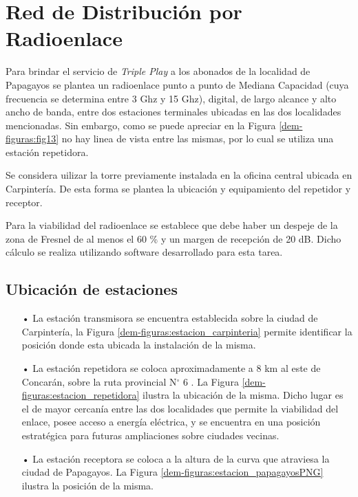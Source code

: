 \section{Red de Distribución por Radioenlace}


Para brindar el servicio de \textit{Triple Play} a los abonados de la localidad de Papagayos se plantea un radioenlace punto a punto de Mediana Capacidad (cuya frecuencia se determina entre 3 Ghz y 15 Ghz), digital, de largo alcance y alto ancho de banda, entre dos estaciones terminales ubicadas en las dos localidades mencionadas. Sin embargo, como se puede apreciar en la Figura \ref{dem-figuras:fig13} no hay linea de vista entre las mismas, por lo cual se utiliza una estación repetidora.


Se considera uilizar la torre previamente instalada en la oficina central ubicada en Carpintería. De esta forma se plantea la ubicación y equipamiento del repetidor y receptor.


Para la viabilidad del radioenlace se establece que debe haber un despeje de la zona de Fresnel de al menos el 60 \% y un margen de recepción de 20 dB. Dicho cálculo se realiza utilizando software desarrollado para esta tarea.


\subsection{Ubicación de estaciones}

\begin{enumerate}
\item[•]La estación transmisora se encuentra establecida sobre la ciudad de Carpintería, la Figura \ref{dem-figuras:estacion_carpinteria} permite identificar la posición donde esta ubicada la instalación de la misma.


\item[•]La estación repetidora se coloca aproximadamente a 8 km al este de Concarán, sobre la ruta provincial N$^{\circ}$ 6 . La Figura \ref{dem-figuras:estacion_repetidora} ilustra la ubicación de la misma.
Dicho lugar es el de mayor cercanía entre las dos localidades que permite la viabilidad del enlace, posee acceso a energía eléctrica, y se encuentra en una posición estratégica para futuras ampliaciones sobre ciudades vecinas.



\item[•]La estación receptora se coloca a la altura de la curva que atraviesa la ciudad de Papagayos. La Figura \ref{dem-figuras:estacion_papagayosPNG} ilustra la posición de la misma.


\end{enumerate}

